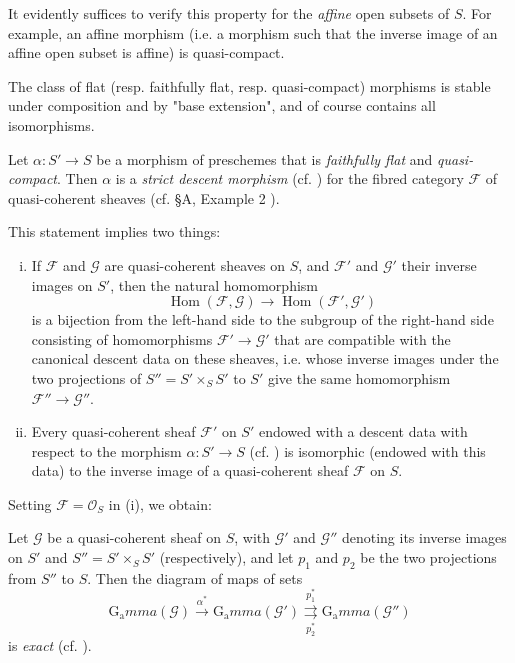 It evidently suffices to verify this property for the \emph{affine} open subsets of $S$.
For example, an affine morphism (i.e. a morphism such that the inverse image of an affine open subset is affine) is quasi-compact.

The class of flat (resp. faithfully flat, resp. quasi-compact) morphisms is stable under composition and by "base extension", and of course contains all isomorphisms.

\begin{theorem}\label{fga3.i-b.1-theorem-1}
    Let $\alpha\colon S'\to S$ be a morphism of preschemes that is \emph{faithfully flat} and \emph{quasi-compact}.
    Then $\alpha$ is a \emph{strict descent morphism} (cf. ) for the fibred category $\mathcal{F}$ of quasi-coherent sheaves (cf. §A, Example 2 ).
\end{theorem}


This statement implies two things:

\begin{enumerate}[i.]
    \item If $\mathcal{F}$ and $\mathcal{G}$ are quasi-coherent sheaves on $S$, and $\mathcal{F}'$ and $\mathcal{G}'$ their inverse images on $S'$, then the natural homomorphism
          \[
              \operatorname{Hom}(\mathcal{F},\mathcal{G}) \to \operatorname{Hom}(\mathcal{F}',\mathcal{G}')
          \]
          is a bijection from the left-hand side to the subgroup of the right-hand side consisting of homomorphisms $\mathcal{F}'\to\mathcal{G}'$ that are compatible with the canonical descent data on these sheaves, i.e. whose inverse images under the two projections of $S''=S'\times_S S'$ to $S'$ give the same homomorphism $\mathcal{F}''\to\mathcal{G}''$.
    \item Every quasi-coherent sheaf $\mathcal{F}'$ on $S'$ endowed with a descent data with respect to the morphism $\alpha\colon S'\to S$ (cf. ) is isomorphic (endowed with this data) to the inverse image of a quasi-coherent sheaf $\mathcal{F}$ on $S$.
\end{enumerate}

Setting $\mathcal{F}=\mathcal{O}_S$ in (i), we obtain:

\begin{corollary}\label{fga3.i-b.1-corollary-1}
    Let $\mathcal{G}$ be a quasi-coherent sheaf on $S$, with $\mathcal{G}'$ and $\mathcal{G}''$ denoting its inverse images on $S'$ and $S''=S'\times_S S'$ (respectively), and let $p_1$ and $p_2$ be the two projections from $S''$ to $S$.
    Then the diagram of maps of sets
    \[
        \operatorname{G_a}mma(\mathcal{G}) \xrightarrow{\alpha^*}
        \operatorname{G_a}mma(\mathcal{G}') \overset{p_1^*}{\underset{p_2^*}{\rightrightarrows}}
        \operatorname{G_a}mma(\mathcal{G}'')
    \]
    is \emph{exact} (cf. ).
\end{corollary}


